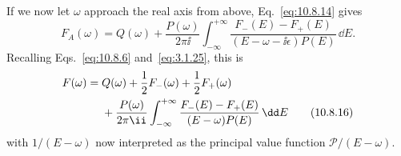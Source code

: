 If we now let $\omega$ approach the real axis from above,
Eq.~\eqref{eq:10.8.14} gives
\begin{equation}
  F_A(\omega)=Q(\omega)+\frac{P(\omega)}{2\pi \ii}
  \int_{-\infty}^{+\infty}
  \frac{F_-(E)-F_+(E)}{(E-\omega-\ii\epsilon)P(E)}\,\dd E.
  \tag{10.8.15}\label{eq:10.8.15}
\end{equation}
Recalling Eqs.~\eqref{eq:10.8.6} and~\eqref{eq:3.1.25}, this is
\begin{align}
  F(\omega)={}&Q(\omega)+\frac12F_-(\omega)+\frac12F_+(\omega)
  \notag\\
  &{}+\frac{P(\omega)}{2\pi \ii}\int_{-\infty}^{+\infty}
  \frac{F_-(E)-F_+(E)}{(E-\omega)P(E)}\,\dd E
  \tag{10.8.16}\label{eq:10.8.16}
\end{align}
with $1/(E-\omega)$ now interpreted as the principal value function
$\mathcal P/(E-\omega)$.

